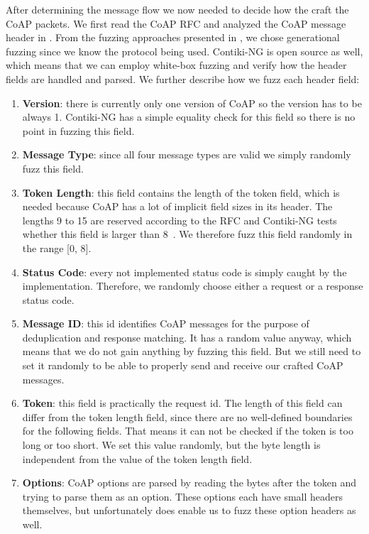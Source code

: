 After determining the message flow we now needed to decide how the craft the CoAP packets. We first read the CoAP RFC and analyzed the CoAP message header in . From the fuzzing approaches presented in , we chose generational fuzzing since we know the protocol being used. Contiki-NG is open source as well, which means that we can employ white-box fuzzing and verify how the header fields are handled and parsed. We further describe how we fuzz each header field:
\begin{enumerate}
	\item \textbf{Version}: there is currently only one version of CoAP so the version has to be always 1. Contiki-NG has a simple equality check for this field so there is no point in fuzzing this field.
	\item \textbf{Message Type}: since all four message types are valid we simply randomly fuzz this field.
	\item \textbf{Token Length}: this field contains the length of the token field, which is needed because CoAP has a lot of implicit field sizes in its header. The lengths 9 to 15 are reserved according to the RFC and Contiki-NG tests whether this field is larger than 8~\cite{RFC7252}. We therefore fuzz this field randomly in the range [0, 8].
	\item \textbf{Status Code}: every not implemented status code is simply caught by the implementation. Therefore, we randomly choose either a request or a response status code.
	\item \textbf{Message ID}: this id identifies CoAP messages for the purpose of deduplication and response matching. It has a random value anyway, which means that we do not gain anything by fuzzing this field. But we still need to set it randomly to be able to properly send and receive our crafted CoAP messages.
	\item \textbf{Token}: this field is practically the request id. The length of this field can differ from the token length field, since there are no well-defined boundaries for the following fields. That means it can not be checked if the token is too long or too short. We set this value randomly, but the byte length is independent from the value of the token length field.
	\item \textbf{Options}: CoAP options are parsed by reading the bytes after the token and trying to parse them as an option. These options each have small headers themselves, but unfortunately \scapy does enable us to fuzz these option headers as well.


\end{enumerate}

